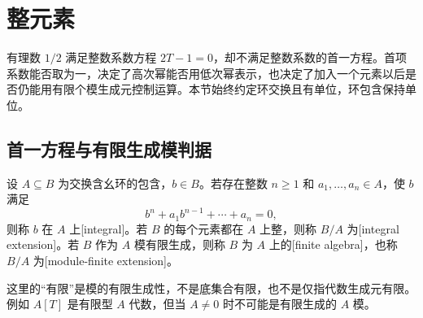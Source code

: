 
\section{整元素}\label{b3:sec:0501}

有理数 \(1/2\) 满足整数系数方程 \(2T-1=0\)，却不满足整数系数的首一方程。首项系数能否取为一，决定了高次幂能否用低次幂表示，也决定了加入一个元素以后是否仍能用有限个模生成元控制运算。本节始终约定环交换且有单位，环包含保持单位。

\subsection{首一方程与有限生成模判据}\label{b3:subsec:0501:01}

\begin{definition}\label{b3:def:integral-element}
	设 \(A\subseteq B\) 为交换含幺环的包含，\(b\in B\)。若存在整数 \(n\ge1\) 和 \(a_1,\ldots,a_n\in A\)，使 \(b\) 满足
	\[
		b^n+a_1b^{n-1}+\cdots+a_n=0,
	\]
	则称 \(b\) 在 \(A\) 上[integral]。若 \(B\) 的每个元素都在 \(A\) 上整，则称 \(B/A\) 为[integral extension]。若 \(B\) 作为 \(A\) 模有限生成，则称 \(B\) 为 \(A\) 上的[finite algebra]，也称 \(B/A\) 为[module-finite extension]。
\end{definition}

这里的“有限”是模的有限生成性，不是底集合有限，也不是仅指代数生成元有限。例如 \(A[T]\) 是有限型 \(A\) 代数，但当 \(A\ne0\) 时不可能是有限生成的 \(A\) 模。

